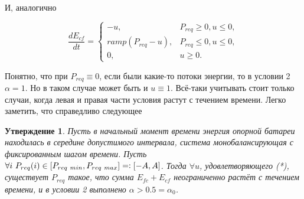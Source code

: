 \documentclass{report}
\newcommand{\eqdef}{=\vcentcolon}
\newtheorem {Statement}{Утверждение}
\begin{document}
И, аналогично

\begin{equation}
\label{f:Ecf}
\frac{dE_{cf}}{dt} = 
\begin{cases}
-u,& P_{req} \geq 0, u \leq 0,\\
ramp(P_{req} - u),& P_{req} \leq0, u \leq 0,\\
0,& u \geq 0.
\end{cases}
\end{equation}


Понятно, что при $P_{req} \equiv 0$, если были какие-то потоки энергии, то в условии 2 $\alpha = 1$. 
Но в таком случае может быть и $u \equiv 1 $. 
Всё-таки учитывать стоит только случаи, когда левая и правая части условия растут с течением времени.
Легко заметить, что справедливо следующее
\begin{Statement}
Пусть в начальный момент времени энергия опорной батареи находилась в середине допустимого интервала, система монобалансирующая с \textit{фиксированным} шагом времени.
Пусть $\forall i ~P_{req}(i) \in [P_{req~min}, P_{req~max}] \eqdef [-A, A]$. 
Тогда $\forall u$, удовлетворяющего (*), существует $P_{req}$ такое, что сумма $E_{fc} + E_{cf}$ неограниченно растёт с течением времени, и в условии 2 выполнено $\alpha > 0.5 = \alpha_0$.
\end{Statement}
\end{document}
